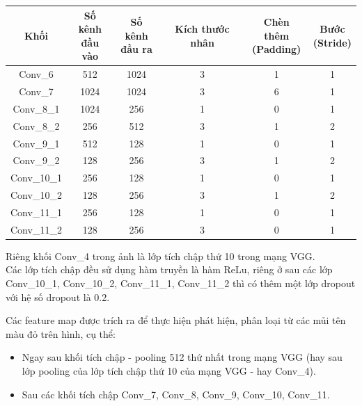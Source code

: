 \documentclass[a4paper,12pt]{article}
\begin{document}
	\begin{center}
		\begin{tabular}{||c | c | c | c | c | c ||} 
			\hline
			Khối & \makecell{ Số kênh \\ đầu vào } & \makecell{ Số kênh \\ đầu ra} & Kích thước nhân &  \makecell{ Chèn thêm \\ (Padding) } &  \makecell{ Bước \\ (Stride) } \\ [0.5ex] 
			\hline\hline
			Conv\_6 & 512 & 1024 & 3 & 1 & 1 \\ 
			\hline
			Conv\_7 & 1024 & 1024 & 3 & 6 & 1 \\ 
			\hline
			Conv\_8\_1 & 1024 & 256 & 1 & 0 & 1 \\ 
			\hline
			Conv\_8\_2 & 256 & 512 & 3 & 1 & 2 \\ 
			\hline
			Conv\_9\_1 & 512 & 128 & 1 & 0 & 1 \\ 
			\hline
			Conv\_9\_2 & 128 & 256 & 3 & 1 & 2 \\ 
			\hline
			Conv\_10\_1 & 256 & 128 & 1 & 0 & 1 \\ 
			\hline
			Conv\_10\_2 & 128 & 256 & 3 & 1 & 2 \\ 
			\hline
			Conv\_11\_1 & 256 & 128 & 1 & 0 & 1 \\ 
			\hline
			Conv\_11\_2 & 128 & 256 & 3 & 0 & 1 \\ 
			\hline
		\end{tabular}
	\end{center}
	
	Riêng khối Conv\_4 trong ảnh là lớp tích chập thứ 10 trong mạng VGG.\\
	
	Các lớp tích chập đều sử dụng hàm truyền là hàm ReLu, riêng ở sau các lớp Conv\_10\_1, Conv\_10\_2, Conv\_11\_1, Conv\_11\_2 thì có thêm một lớp dropout với hệ số dropout là 0.2.
	
	Các feature map được trích ra để thực hiện phát hiện, phân loại từ các mủi tên màu đỏ trên hình, cụ thể:
	
	\begin{itemize}
		\item Ngay sau khối tích chập - pooling 512 thứ nhất trong mạng VGG (hay sau lớp pooling của lớp tích chập thứ 10 của mạng VGG - hay Conv\_4).
		\item Sau các khối tích chập Conv\_7, Conv\_8, Conv\_9, Conv\_10, Conv\_11.
	\end{itemize}
	
\end{document}
